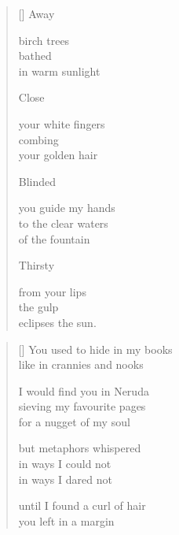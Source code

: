 \documentclass[14pt]{extbook}
\newcommand*{\centeredornament}{\centerline{\pgfornament[width=6cm]{88}}}
\begin{document}
\vspace*{-15mm}
\centeredornament
\vspace*{-7mm}


\settowidth{\versewidth}{to the clear waters}

\begin{verse}[\versewidth]
  Away

  birch trees \\
  bathed \\
  in warm sunlight

  Close

  your white fingers \\
  combing \\
  your golden hair

  Blinded

  you guide my hands \\
  to the clear waters \\
  of the fountain

  Thirsty

  from your lips \\
  the gulp \\
  eclipses the sun.
\end{verse}


\newpage

\vspace*{-15mm}
\centeredornament
\vspace*{-7mm}


\settowidth{\versewidth}{You used to hide in my books}

\begin{verse}[\versewidth]
  You used to hide in my books \\
  like in crannies and nooks

  I would find you in Neruda \\
  sieving my favourite pages \\
  for a nugget of my soul

  but metaphors whispered \\
  in ways I could not \\
  in ways I dared not

  until I found a curl of hair \\
  you left in a margin
\end{verse}
\end{document}
